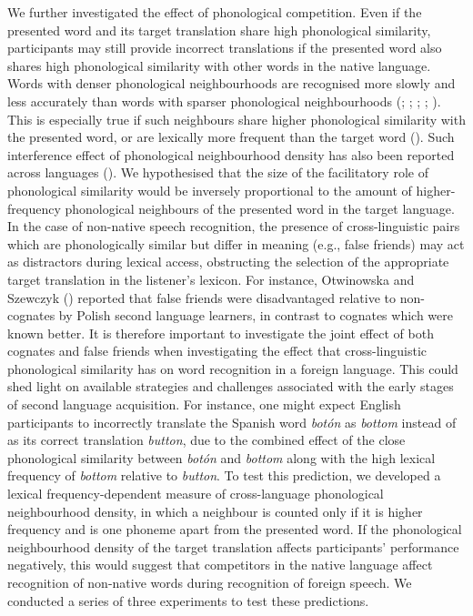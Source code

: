 \documentclass[
  man,
  longtable,
  nolmodern,
  notxfonts,
  notimes,
  colorlinks=true,linkcolor=blue,citecolor=blue,urlcolor=blue]{apa7}
\begin{document}
We further investigated the effect of phonological competition. Even if
the presented word and its target translation share high phonological
similarity, participants may still provide incorrect translations if the
presented word also shares high phonological similarity with other words
in the native language. Words with denser phonological neighbourhoods
are recognised more slowly and less accurately than words with sparser
phonological neighbourhoods (; ; ; ;
). This is
especially true if such neighbours share higher phonological similarity
with the presented word, or are lexically more frequent than the target
word (). Such
interference effect of phonological neighbourhood density has also been
reported across languages (). We hypothesised that the size of the facilitatory role
of phonological similarity would be inversely proportional to the amount
of higher-frequency phonological neighbours of the presented word in the
target language. In the case of non-native speech recognition, the
presence of cross-linguistic pairs which are phonologically similar but
differ in meaning (e.g., false friends) may act as distractors during
lexical access, obstructing the selection of the appropriate target
translation in the listener's lexicon. For instance, Otwinowska and
Szewczyk () reported that false
friends were disadvantaged relative to non-cognates by Polish second
language learners, in contrast to cognates which were known better. It
is therefore important to investigate the joint effect of both cognates
and false friends when investigating the effect that cross-linguistic
phonological similarity has on word recognition in a foreign language.
This could shed light on available strategies and challenges associated
with the early stages of second language acquisition. For instance, one
might expect English participants to incorrectly translate the Spanish
word \emph{botón} as \emph{bottom} instead of as its correct translation
\emph{button}, due to the combined effect of the close phonological
similarity between \emph{botón} and \emph{bottom} along with the high
lexical frequency of \emph{bottom} relative to \emph{button}. To test
this prediction, we developed a lexical frequency-dependent measure of
cross-language phonological neighbourhood density, in which a neighbour
is counted only if it is higher frequency and is one phoneme apart from
the presented word. If the phonological neighbourhood density of the
target translation affects participants' performance negatively, this
would suggest that competitors in the native language affect recognition
of non-native words during recognition of foreign speech. We conducted a
series of three experiments to test these predictions.
\end{document}
